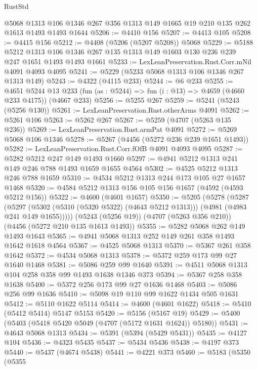 \begin{lexlean}{RustStd}
\begin{coremodule}
    @5068
    @1313
    @106
    @1346
    @267
    @356
    @1313
    @149
    @1665
    @19
    @210
    @135
    @262
    @1613
    @1493
    @1493
    @1644
@5206 := @4410 @156
@5207 := @4413 @105
@5208 := @4415 @156
@5212 := @4408 (@5206 (@5207 @5208)) @5068
@5229 := @5188
    @5212
    @1313
    @106
    @1346
    @267
    @135
    @1313
    @149
    @1603
    @130
    @236
    @239
    @247
    @1651
    @1493
    @1493
    @1661
@5233 := LexLeanPreservation.Rust.Corr.mNil @4091 @4093 @4095
@5241 := @5229 (@5233 @5068 @1313 @106 @1346 @267 @1313 @149)
@5243 := @4322 (@4115 @233)
@5244 := @6 @233
@5255 := @4651
    @5244
    @13
    @233
    (fun (as : @5244) => fun (i : @13) => @4659 (@4660 @233 @4175))
    (@4667 @233)
@5256 := @5255 @267
@5259 := @5241 (@5243 (@5256 @130))
@5261 := LexLeanPreservation.Rust.otherArms @4091
@5262 := @5261 @106
@5263 := @5262 @267
@5267 := @5259 (@4707 (@5263 @135 @236))
@5269 := LexLeanPreservation.Rust.armPat @4091
@5272 := @5269 @5068 @106 @1346
@5278 := @5267 (@4456 (@5272 @236 @239 @1651 @1493))
@5282 := LexLeanPreservation.Rust.Corr.fOfB @4091 @4093 @4095
@5287 := @5282 @5212 @247 @149 @1493 @1660
@5297 := @4941 @5212 @1313 @241 @149 @246 @788 @1493 @1659 @1655 @4564
@5302 := @4525 @5212 @1313 @246 @788 @1659
@5310 := @4534 @5212 @1313 @244 @173 @105 @27 @1657 @1468
@5320 := @4584 @5212 @1313 @156 @105 @156 @1657 (@4592 (@4593 @5212 @156))
@5322 := @4600 (@4601 @1657)
@5350 := @5205
    (@5278
      (@5287
        (@5297 (@5302 (@5310 (@5320 @5322) (@4643 @5212 @1313))) (@4981 (@4983 @241 @149 @1655)))))
    (@5243 (@5256 @19))
    (@4707 (@5263 @356 @210))
    (@4456 (@5272 @210 @135 @1613 @1493))
@5355 := @5282 @5068 @262 @149 @1493 @1643
@5365 := @4941 @5068 @1313 @252 @149 @261 @358 @1493 @1642 @1618 @4564
@5367 := @4525 @5068 @1313
@5370 := @5367 @261 @358 @1642
@5372 := @4534 @5068 @1313
@5378 := @5372 @259 @173 @99 @27 @1640 @1468
@5381 := @5086 @259 @99 @1640
@5391 := @4511 @5068 @1313 @104 @258 @358 @99 @1493 @1638 @1346 @373
@5394 := @5367 @258 @358 @1638
@5400 := @5372 @256 @173 @99 @27 @1636 @1468
@5403 := @5086 @256 @99 @1636
@5410 := @5098 @19 @110 @99 @1622 @1434 @505 @1631
@5412 := @5110 @1622 @5114
@5414 := @4600 (@4601 @1622)
@5418 := @5410 (@5412 @5414) @5147 @5153
@5420 := @5156 (@5167 @19)
@5429 := @5400 (@5403 (@5418 @5420 @5049 (@4707 (@5172 @1631 @1624)) @5180))
@5431 := @4643 @5068 @1313
@5434 := @5391 (@5394 (@5429 @5431))
@5435 := @4127 @104
@5436 := @4323 @5435
@5437 := @5434 @5436
@5438 := @4197 @373
@5440 := @5437 (@4674 @5438)
@5441 := @4221 @373
@5460 := @5183
    (@5350
      (@5355

\end{coremodule}
\end{lexlean}
